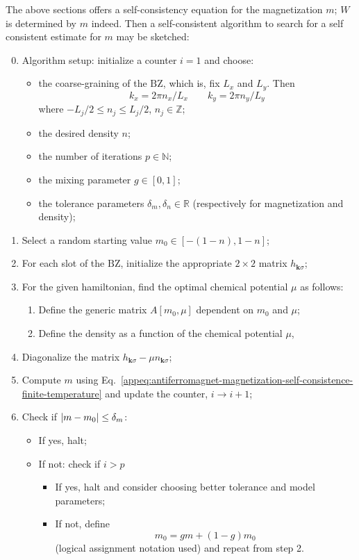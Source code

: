 The above sections offers a self-consistency equation for the magnetization $m$; $W$ is determined by $m$ indeed. Then a self-consistent algorithm to search for a self consistent estimate for $m$ may be sketched:
\begin{enumerate}
	\setcounter{enumi}{-1}
	\item Algorithm setup: initialize a counter $i=1$ and choose:
	\begin{itemize}
		\item the coarse-graining of the $\mathrm{BZ}$, which is, fix $L_x$ and $L_y$. Then 
		\[ 
			k_x = 2\pi n_x/L_x
			\qquad
			k_y = 2\pi n_y/L_y 
		\]
		where $-L_j/2 \le n_j \le L_j/2$, $n_j \in \mathbb{Z}$;
		\item the desired density $n$;
		\item the number of iterations $p \in \mathbb{N}$; 
		\item the mixing parameter $g \in [0,1]$;
		\item the tolerance parameters $\delta_m, \delta_n \in \mathbb{R}$ (respectively for magnetization and density);
	\end{itemize}
	\item Select a random starting value $m_0 \in [-(1-n),1-n]$;
	\item For each slot of the $\mathrm{BZ}$, initialize the appropriate $2\times2$ matrix $h_{\mathbf{k}\sigma}$;
	\item For the given hamiltonian, find the optimal chemical potential $\mu$ as follows:
	\begin{enumerate}
		\item Define the generic matrix $A[m_0, \mu]$ dependent on $m_0$ and $\mu$;
		\item Define the density as a function of the chemical potential $\mu$,
		\[
			
		\]
	\end{enumerate}
	\item Diagonalize the matrix $h_{\mathbf{k}\sigma} - \mu n_{\mathbf{k}\sigma}$;
	\item Compute $m$ using Eq.~\eqref{appeq:antiferromagnet-magnetization-self-consistence-finite-temperature} and update the counter, $i \to i+1$;
	\item Check if $\abs{m-m_0} \le \delta_m$:
	\begin{itemize}
		\item If yes, halt;
		\item If not: check if $i > p$
		\begin{itemize}
			\item If yes, halt and consider choosing better tolerance and model parameters;
			\item If not, define 
			\[
				m_0 = gm + (1-g)m_0
			\]
			(logical assignment notation used) and repeat from step 2.
		\end{itemize}
	\end{itemize}
\end{enumerate}
{\color{tabred}}
\todo


